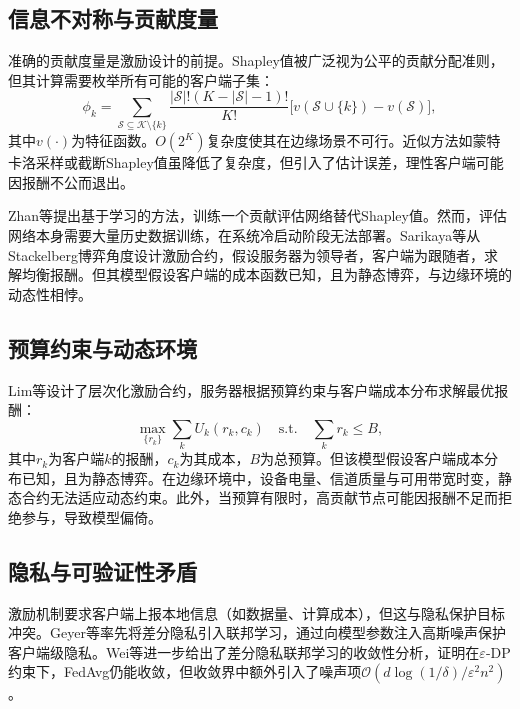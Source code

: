 \documentclass[a4paper,12pt]{article}
\begin{document}
\subsection{信息不对称与贡献度量}

准确的贡献度量是激励设计的前提。Shapley值被广泛视为公平的贡献分配准则，但其计算需要枚举所有可能的客户端子集：
\begin{equation}
\phi_k = \sum_{\mathcal{S} \subseteq \mathcal{K} \setminus \{k\}} \frac{|\mathcal{S}|!(K-|\mathcal{S}|-1)!}{K!} \big[ v(\mathcal{S} \cup \{k\}) - v(\mathcal{S}) \big],
\end{equation}
其中$v(\cdot)$为特征函数。$O(2^K)$复杂度使其在边缘场景不可行。近似方法如蒙特卡洛采样或截断Shapley值虽降低了复杂度，但引入了估计误差，理性客户端可能因报酬不公而退出。

Zhan等\cite{zhan2020learning}提出基于学习的方法，训练一个贡献评估网络替代Shapley值。然而，评估网络本身需要大量历史数据训练，在系统冷启动阶段无法部署。Sarikaya等\cite{sarikaya2020motivating}从Stackelberg博弈角度设计激励合约，假设服务器为领导者，客户端为跟随者，求解均衡报酬。但其模型假设客户端的成本函数已知，且为静态博弈，与边缘环境的动态性相悖。

\subsection{预算约束与动态环境}

Lim等\cite{lim2020hierarchical}设计了层次化激励合约，服务器根据预算约束与客户端成本分布求解最优报酬：
\begin{equation}
\max_{\{r_k\}} \sum_{k} U_k(r_k, c_k) \quad \text{s.t.} \quad \sum_k r_k \leq B,
\end{equation}
其中$r_k$为客户端$k$的报酬，$c_k$为其成本，$B$为总预算。但该模型假设客户端成本分布已知，且为静态博弈。在边缘环境中，设备电量、信道质量与可用带宽时变，静态合约无法适应动态约束。此外，当预算有限时，高贡献节点可能因报酬不足而拒绝参与，导致模型偏倚。

\subsection{隐私与可验证性矛盾}

激励机制要求客户端上报本地信息（如数据量、计算成本），但这与隐私保护目标冲突。Geyer等\cite{geyer2017differentially}率先将差分隐私引入联邦学习，通过向模型参数注入高斯噪声保护客户端级隐私。Wei等\cite{wei2020federated}进一步给出了差分隐私联邦学习的收敛性分析，证明在$\varepsilon$-DP约束下，FedAvg仍能收敛，但收敛界中额外引入了噪声项$\mathcal{O}(d\log(1/\delta)/\varepsilon^2 n^2)$。
\end{document}
